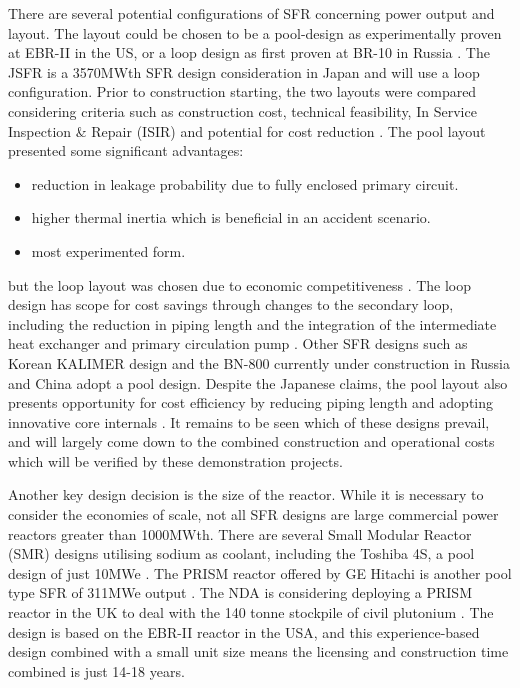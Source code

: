 \documentclass[journal]{IEEEtran}
\begin{document}
There are several potential configurations of SFR concerning power output and layout. 
The layout could be chosen to be a pool-design as experimentally proven at EBR-II in the US, or a loop design as first proven at BR-10 in Russia \cite{Int2012}. 
The JSFR is a 3570MWth SFR design consideration in Japan and will use a loop configuration. 
Prior to construction starting, the two layouts were compared considering criteria such as construction cost, technical feasibility, In Service Inspection \& Repair (ISIR) and potential for cost reduction \cite{Sakamoto2013194}.
The pool layout presented some significant advantages:
\begin{itemize}
\item reduction in leakage probability due to fully enclosed primary circuit.
\item higher thermal inertia which is beneficial in an accident scenario.
\item most experimented form.
\end{itemize}
but the loop layout was chosen due to economic competitiveness \cite{Locatelli2013}. 
The loop design has scope for cost savings through changes to the secondary loop, including the reduction in piping length and the integration of the intermediate heat exchanger and primary circulation pump \cite{Sakamoto2013194}. 
Other SFR designs such as Korean KALIMER design and the BN-800 currently under construction in Russia and China adopt a pool design. Despite the Japanese claims, the pool layout also presents opportunity for cost efficiency by reducing piping length and adopting innovative core internals \cite{Locatelli2013}. It remains to be seen which of these designs prevail, and will largely come down to the combined construction and operational costs which will be verified by these demonstration projects.

Another key design decision is the size of the reactor. 
While it is necessary to consider the economies of scale, not all SFR designs are large commercial power reactors greater than 1000MWth.
There are several Small Modular Reactor (SMR) designs utilising sodium as coolant, including the Toshiba 4S, a pool design of just 10MWe \cite{Locatelli2013}. 
The PRISM reactor offered by GE Hitachi is another pool type SFR of 311MWe output \cite{Locatelli2013}. 
The NDA is considering deploying a PRISM reactor in the UK to deal with the 140 tonne stockpile of civil plutonium \cite{NDA14}. 
The design is based on the EBR-II reactor in the USA, and this experience-based design combined with a small unit size means the licensing and construction time combined is just 14-18 years\cite{NDA14}.
\end{document}
